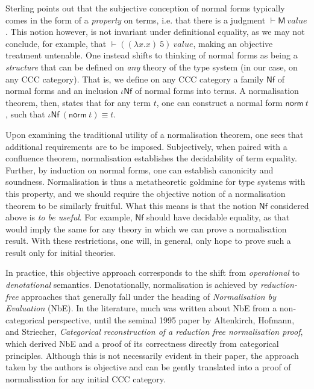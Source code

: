 \documentclass{article}[9pt]
\newcommand{\bkt}[1]{\left(#1\right)}
\begin{document}
Sterling points out that the subjective conception of normal forms typically
comes in the form of a \emph{property} on terms, i.e. that there is a judgment
$\vdash \textsf{M}~value$. This notion however, is not invariant under
definitional equality, as we may not conclude, for example, that $\vdash
\bkt{\bkt{\lambda x. x}~5}~value$, making an objective treatment untenable. One
instead shifts to thinking of normal forms as being a \emph{structure} that can
be defined on \emph{any} theory of the type system (in our case, on any CCC
category). That is, we define on any CCC category a family $\mathsf{Nf}$ of
normal forms and an inclusion $\iota\mathsf{Nf}$ of normal forms into terms. A
normalisation theorem, then, states that for any term $t$, one can construct a
normal form $\mathsf{norm}~t$, such that $\iota\mathsf{Nf}~\bkt{\mathsf{norm}
~t} \equiv t$.

Upon examining the traditional utility of a normalisation theorem, one sees that
additional requirements are to be imposed. Subjectively, when paired with a
confluence theorem, normalisation establishes the decidability of term equality.
Further, by induction on normal forms, one can establish canonicity and
soundness. Normalisation is thus a metatheoretic goldmine for type systems with
this property, and we should require the objective notion of a normalisation
theorem to be similarly fruitful. What this means is that the notion
$\mathsf{Nf}$ considered above is \emph{to be useful}. For example,
$\mathsf{Nf}$ should have decidable equality, as that would imply the same for
any theory in which we can prove a normalisation result. With these
restrictions, one will, in general, only hope to prove such a result only for
initial theories.

In practice, this objective approach corresponds to the shift from
\emph{operational} to \emph{denotational} semantics. Denotationally,
normalisation is achieved by \emph{reduction-free} approaches that generally
fall under the heading of \emph{Normalisation by Evaluation} (NbE). In the
literature, much was written about NbE from a non-categorical perspective, until
the seminal 1995 paper by Altenkirch, Hofmann, and Striecher, \emph{Categorical
reconstruction of a reduction free normalisation proof}, which derived NbE and a
proof of its correctness directly from categorical principles. Although this is
not necessarily evident in their paper, the approach taken by the authors is
objective and can be gently translated into a proof of normalisation for any
initial CCC category.
\end{document}
